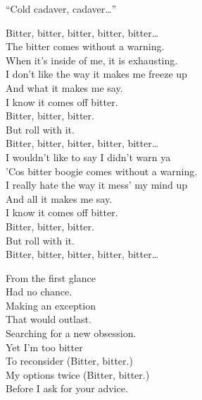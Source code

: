 ``Cold cadaver, cadaver…'' \\





Bitter, bitter, bitter, bitter, bitter… \\

The bitter  comes without a warning. \\
When it's inside of me, it is exhausting. \\
I don't like the way it makes me freeze up \\
And what it makes me say. \\

I know it comes off bitter. \\
Bitter, bitter, bitter. \\
But roll with it. \\

Bitter, bitter, bitter, bitter, bitter… \\

I wouldn't like to say I didn't warn ya \\
'Cos bitter boogie comes without a warning. \\
I really hate the way it mess' my mind up \\
And all it makes me say. \\

I know it comes off bitter. \\
Bitter, bitter, bitter. \\
But roll with it. \\

Bitter, bitter, bitter, bitter, bitter… \\


From the first glance \\
Had no chance. \\
Making an exception \\
That would outlast. \\
Searching for a new obsession. \\

Yet I'm too bitter \\
To reconsider (Bitter, bitter.) \\
My options twice (Bitter, bitter.) \\
Before I ask for your advice. \\

